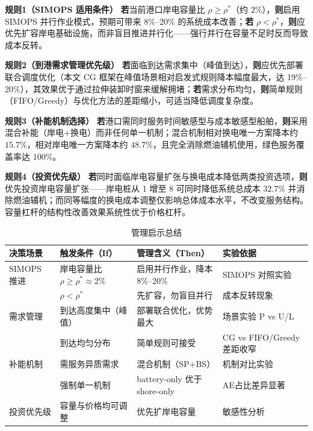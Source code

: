 \documentclass[UTF8, a4paper, 12pt]{ctexart}
\theoremstyle{plain}
\theoremstyle{definition}
\theoremstyle{remark}
\begin{document}
\textbf{规则1（SIMOPS 适用条件）}
\textbf{若}当前港口岸电容量比 $\rho \ge \rho^*$（约 $2\%$），\textbf{则}启用 SIMOPS 并行作业模式，预期可带来 $8\%$--$20\%$ 的系统成本改善；\textbf{若} $\rho < \rho^*$，\textbf{则}应优先扩容岸电基础设施，而非盲目推进并行化——强行并行在容量不足时反而导致成本反转。

\textbf{规则2（到港需求管理优先级）}
\textbf{若}面临到达需求集中（峰值到达），\textbf{则}应优先部署联合调度优化（本文 CG 框架在峰值场景相对启发式规则降本幅度最大，达 19\%--20\%），其效果优于通过拉伸装卸时窗来缓解拥堵；\textbf{若}需求分布均匀，\textbf{则}简单规则（FIFO/Greedy）与优化方法的差距缩小，可适当降低调度复杂度。

\textbf{规则3（补能机制选择）}
\textbf{若}港口需同时服务时间敏感型与成本敏感型船舶，\textbf{则}采用混合补能（岸电+换电）而非任何单一机制；混合机制相对换电唯一方案降本约 $15.7\%$，相对岸电唯一方案降本约 $48.7\%$，且完全消除燃油辅机使用，绿色服务覆盖率达 $100\%$。

\textbf{规则4（投资优先级）}
\textbf{若}同时面临岸电容量扩张与换电成本降低两类投资选项，\textbf{则}优先投资岸电容量扩张——岸电桩从 1 增至 8 可同时降低系统总成本 $32.7\%$ 并消除燃油辅机；而同等幅度的换电成本调整仅影响总体成本水平，不改变服务结构。容量杠杆的结构性改善效果系统性优于价格杠杆。

\begin{table}[htbp]
\centering
\caption{管理启示总结}
\label{tab:mgmt_rules}
\scriptsize
\setlength{\tabcolsep}{4pt}
\renewcommand{\arraystretch}{1.15}
\begin{tabular}{p{1.8cm} p{3.5cm} p{3.5cm} p{3.5cm}}
\toprule
决策场景 & 触发条件（If） & 管理含义（Then） & 实验依据 \\
\midrule
SIMOPS 推进 & 岸电容量比 $\rho \ge \rho^*\approx2\%$ & 启用并行作业，降本 8\%--20\% & SIMOPS 对照实验 \\
           & $\rho < \rho^*$ & 先扩容，勿盲目并行 & 成本反转现象 \\
\addlinespace
需求管理 & 到达高度集中（峰值） & 部署联合优化，优势最大 & 场景实验 P vs U/L \\
         & 到达均匀分布 & 简单规则可接受 & CG vs FIFO/Greedy差距收窄 \\
\addlinespace
补能机制 & 需服务异质需求 & 混合机制（SP+BS） & 机制对比实验 \\
         & 强制单一机制 & battery-only 优于 shore-only & AE占比差异显著 \\
\addlinespace
投资优先级 & 容量与价格均可调整 & 优先扩岸电容量 & 敏感性分析 \\
\bottomrule
\end{tabular}
\end{table}
\end{document}
